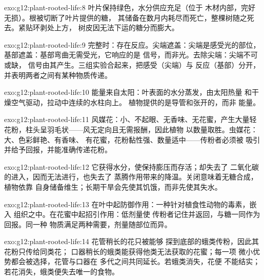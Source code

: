 \begin{solution}{exo:g12:plant-rooted-life:8}
叶片保持绿色，水分供应充足（位于
木材内部，完好无损）。根被切断了叶片提供的糖，
其储备在数月内耗尽而死亡，整棵树随之死去。紧贴环剥处上方，
树皮因无法下运的糖分而膨大。
\end{solution}

\begin{solution}{exo:g12:plant-rooted-life:9}
完整时：存在反应。尖端遮盖：尖端是感受光的部位，
基部遮盖：基部弯曲无需受光，它响应的是
信号，而非光。去除尖端：尖端不可或缺，
信号由其产生。三组实验合起来，把感受（尖端）与
反应（基部）分开，并表明两者之间有某种物质传递。
\end{solution}

\begin{solution}{exo:g12:plant-rooted-life:10}
能量来自太阳：叶表面的水分蒸发，由太阳热量
和干燥空气驱动，拉动中连续的水柱向上。
植物提供的是导管和张开的，而非
能量。
\end{solution}

\begin{solution}{exo:g12:plant-rooted-life:11}
风媒花：小、不起眼、无香味、无花蜜，产生大量轻
花粉，柱头呈羽毛状——风无定向且无需报酬，因此植物
以数量取胜。虫媒花：大、色彩鲜艳、有香味、
有花蜜，花粉黏性强、数量适中——传粉者必须被
吸引并给予回报，并能准确传递花粉。
\end{solution}

\begin{solution}{exo:g12:plant-rooted-life:12}
它获得水分，使保持膨压而存活；却失去了
二氧化碳的进入，因而无法进行，也失去了
蒸腾作用带来的降温。关闭意味着无糖合成，植物依靠
自身储备维生；长期干旱会先使其饥饿，而非先使其失水。
\end{solution}

\begin{solution}{exo:g12:plant-rooted-life:13}
在叶中起防御作用：一种针对植食性动物的毒素，嵌入
组织之中。在花蜜中起招引作用：低剂量使
传粉者记住并返回，与糖一同作为回报。同一种
物质满足两种需要，剂量随部位而异。
\end{solution}

\begin{solution}{exo:g12:plant-rooted-life:14}
花管稍长的花只被能够
探到底部的蛾类传粉，因此其花粉只传给同类花；
口器稍长的蛾类能获得他类无法获取的花蜜；每一项
微小优势都会被选择，花管与口器在
多代之间共同延长。若蛾类消失，花便
不能结实；若花消失，蛾类便失去唯一的食物。
\end{solution}


